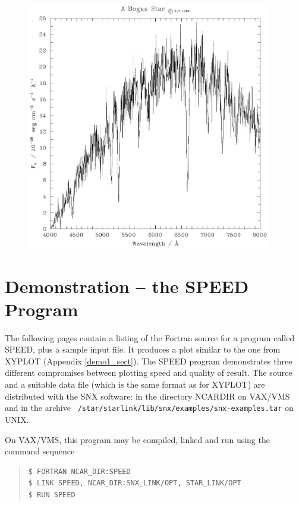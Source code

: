 \documentclass[twoside,11pt]{article}
\renewcommand{\_}{\texttt{\symbol{95}}}
\begin{document}
\begin{figure}
\includegraphics[width=0.95\textwidth]{sun90-fig-1.eps}
\end{figure}

\section {Demonstration -- the SPEED Program} \label{demo2_sect}

The following pages contain a listing of the Fortran source for a
program called SPEED, plus a sample input file.  It produces a plot
similar to the one from XYPLOT (Appendix \ref{demo1_sect}).  The SPEED
program demonstrates three different compromises between plotting speed
and quality of result.  The source and a suitable data file (which is
the same format as for XYPLOT) are distributed with the SNX software:
in the directory NCAR\_DIR on VAX/VMS and in the archive {\tt
/star/\-starlink/\-lib/\-snx/examples/snx-examples.tar} on UNIX.

On VAX/VMS, this program may be compiled, linked and run using the command
sequence

\begin {quote}
\begin{verbatim}
$ FORTRAN NCAR_DIR:SPEED
$ LINK SPEED, NCAR_DIR:SNX_LINK/OPT, STAR_LINK/OPT
$ RUN SPEED
\end{verbatim}
\end {quote}
\end{document}
